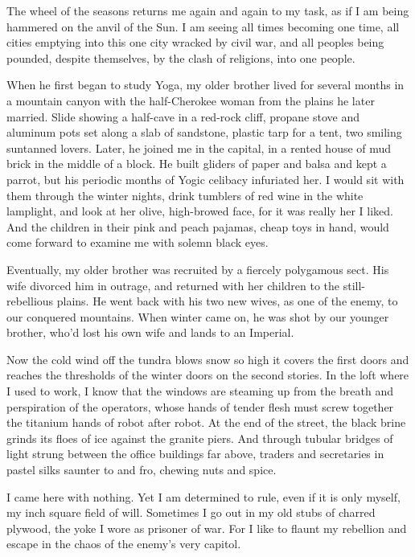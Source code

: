 \documentclass[english,11pt,letterpaper,onecolumn]{scrbook}
\begin{document}
	The wheel of the seasons returns me again and again to my task, as if I am being hammered on the anvil of the Sun.  I am seeing all times becoming one time, all cities emptying into this one city wracked by civil war, and all peoples being pounded, despite themselves, by the clash of religions, into one people.

	When he first began to study Yoga, my older brother lived for several months in a mountain canyon with the half-Cherokee woman from the plains he later married.  Slide showing a half-cave in a red-rock cliff, propane stove and aluminum pots set along a slab of sandstone, plastic tarp for a tent, two smiling suntanned lovers.  Later, he joined me in the capital, in a rented house of mud brick in the middle of a block.  He built gliders of paper and balsa and kept a parrot, but his periodic months of Yogic celibacy infuriated her.  I would sit with them through the winter nights, drink tumblers of red wine in the white lamplight, and look at her olive, high-browed face, for it was really her I liked.  And the children in their pink and peach pajamas, cheap toys in hand, would come forward to examine me with solemn black eyes.

	Eventually, my older brother was recruited by a fiercely polygamous sect.  His wife divorced him in outrage, and returned with her children to the still-rebellious plains.  He went back with his two new wives, as one of the enemy, to our conquered mountains.  When winter came on, he was shot by our younger brother, who'd lost his own wife and lands to an Imperial.

	Now the cold wind off the tundra blows snow so high it covers the first doors and reaches the thresholds of the winter doors on the second stories.  In the loft where I used to work, I know that the windows are steaming up from the breath and perspiration of the operators, whose hands of tender flesh must screw together the titanium hands of robot after robot.  At the end of the street, the black brine grinds its floes of ice against the granite piers.  And through tubular bridges of light strung between the office buildings far above, traders and secretaries in pastel silks saunter to and fro, chewing nuts and spice.

	I came here with nothing.  Yet I am determined to rule, even if it is only myself, my inch square field of will.  Sometimes I go out in my old stubs of charred plywood, the yoke I wore as prisoner of war.  For I like to flaunt my rebellion and escape in the chaos of the enemy's very capitol.
\end{document}
